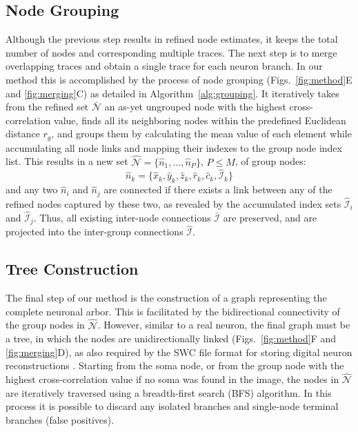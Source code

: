 \subsection{Node Grouping}
\label{subsec:node-grouping}
Although the previous step results in refined node estimates, it keeps the total number of nodes and corresponding multiple traces. The next step is to merge overlapping traces and obtain a single trace for each neuron branch. In our method this is accomplished by the process of node grouping (Figs.~\ref{fig:method}E and \ref{fig:merging}C) as detailed in Algorithm~\ref{alg:grouping}. It iteratively takes from the refined set $\bar{\mathcal{N}}$ an as-yet ungrouped node with the highest cross-correlation value, finds all its neighboring nodes within the predefined Euclidean distance $r_g$, and groups them by calculating the mean value of each element while accumulating all node links and mapping their indexes to the group node index list. This results in a new set $\hat{\mathcal{N}} = \lbrace \hat{n}_1,\dots,\hat{n}_P \rbrace$, $P \leq M$, of group nodes:
\begin{equation}
\label{eq:hat_n_k}
\hat{n}_k=\lbrace\hat{x}_k, \hat{y}_k, \hat{z}_k, \hat{r}_k, \hat{c}_k, \hat{\mathcal{I}}_k\rbrace
\end{equation}
and any two $\hat{n}_i$ and $\hat{n}_j$ are connected if there exists a link between any of the refined nodes captured by these two, as revealed by the accumulated index sets $\hat{\mathcal{I}}_i$ and $\hat{\mathcal{I}}_j$. Thus, all existing inter-node connections $\bar{\mathcal{I}}$ are preserved, and are projected into the inter-group connections $\hat{\mathcal{I}}$.

\subsection{Tree Construction}
\label{subsec:tree-construction}
The final step of our method is the construction of a graph representing the complete neuronal arbor. This is facilitated by the bidirectional connectivity of the group nodes in $\hat{\mathcal{N}}$. However, similar to a real neuron, the final graph must be a tree, in which the nodes are unidirectionally linked (Figs.~\ref{fig:method}F and \ref{fig:merging}D), as also required by the SWC file format for storing digital neuron reconstructions \citep{stockley1993system, cannon1998line}. Starting from the soma node, or from the group node with the highest cross-correlation value if no soma was found in the image, the nodes in $\hat{\mathcal{N}}$ are iteratively traversed using a breadth-first search (BFS) algorithm. In this process it is possible to discard any isolated branches and single-node terminal branches (false positives).

